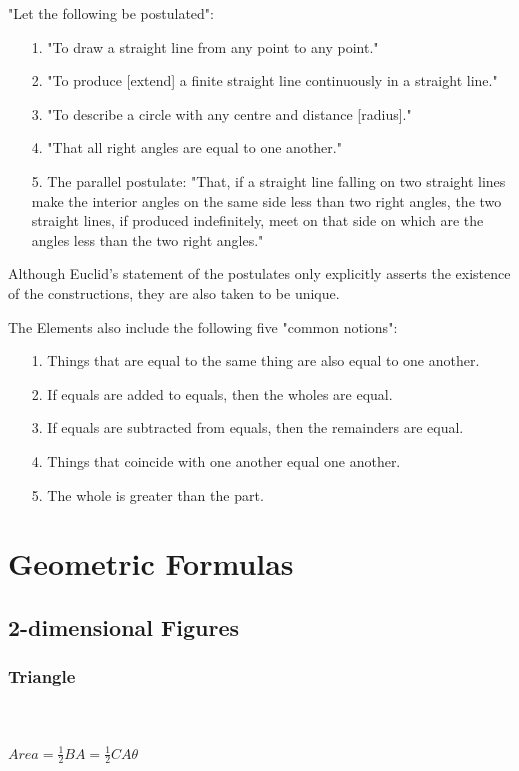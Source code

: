 \documentclass[10pt]{report}
\begin{document}
"Let the following be postulated":
\begin{itemize}
\item[1.]"To draw a straight line from any point to any point."
\item[2.]"To produce [extend] a finite straight line continuously in a straight line."
\item[3.]"To describe a circle with any centre and distance [radius]."
\item[4.]"That all right angles are equal to one another."
\item[5.]The parallel postulate: "That, if a straight line falling on two straight lines make the interior angles on the same side less than two right angles, the two straight lines, if produced indefinitely, meet on that side on which are the angles less than the two right angles."
\end{itemize}
Although Euclid's statement of the postulates only explicitly asserts the existence of the constructions, they are also taken to be unique.

The Elements also include the following five "common notions":
\begin{itemize}
\item[1.]Things that are equal to the same thing are also equal to one another.
\item[2.]If equals are added to equals, then the wholes are equal.
\item[3.]If equals are subtracted from equals, then the remainders are equal.
\item[4.]Things that coincide with one another equal one another.
\item[5.]The whole is greater than the part.
\end{itemize}

\chapter{Geometric Formulas}
\section{2-dimensional Figures}

\subsection{Triangle}
\\\\
$Area=\frac{1}{2}BA=\frac{1}{2}CA\theta$
\end{document}
